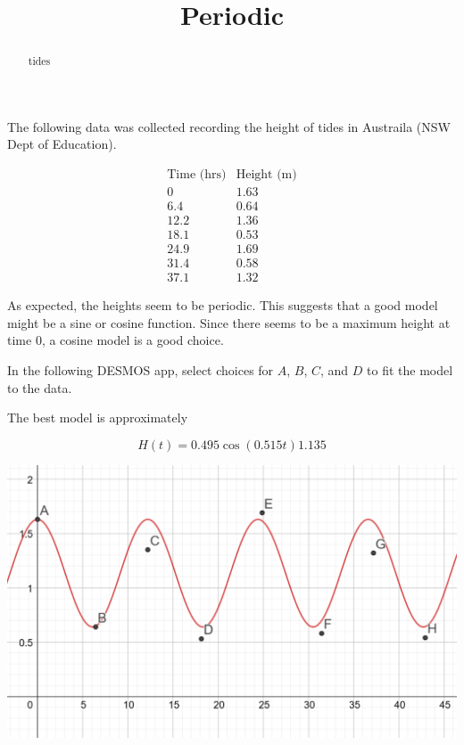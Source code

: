 \documentclass{ximera}
\title{Periodic}
\begin{document}
\begin{abstract}
tides
\end{abstract}
\maketitle


The following data was collected recording the height of tides in Austraila (NSW Dept of Education).




\[
\begin{array}{ll}
\text{Time (hrs)}  & \text{Height (m)}  \\
0      &  1.63  \\
6.4    &  0.64  \\
12.2   &  1.36  \\
18.1   &  0.53  \\
24.9   &  1.69  \\
31.4   &  0.58  \\
37.1   &  1.32
\end{array}
\]


As expected, the heights seem to be periodic.  This suggests that a good model might be a sine or cosine function.  Since there seems to be a maximum height at time $0$, a cosine model is a good choice.




In the following DESMOS app, select choices for $A$, $B$, $C$, and $D$ to fit the model to the data.

\begin{center}
\end{center}


The best model is approximately

\[   H(t) = 0.495 \cos(0.515 t) 1.135       \]







\begin{image}
\includegraphics{pics/tides.png}
\end{image}
\end{document}
